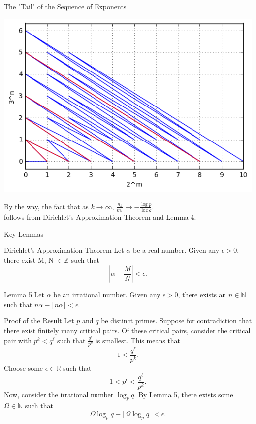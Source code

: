 \documentclass{beamer}
\newcommand{\Z}{{\mathbb Z}}
\newcommand{\N}{{\mathbb N}}
\newcommand{\R}{{\mathbb R}}
\newcommand\floor[1]{\lfloor#1\rfloor}
\begin{document}
\begin{frame}{The "Tail" of the Sequence of Exponents}%
\begin{center}

\includegraphics[scale=.48]{slope_plot4.png} 

By the way, the fact that as $k \to \infty$, $\frac{n_k}{m_k} \to -\frac{\log p}{\log q}$. \\ follows from Dirichlet's Approximation Theorem and Lemma 4. 
\end{center}

\end{frame}

\begin{frame}{Key Lemmas} 
    \begin{block}{Dirichlet's Approximation Theorem}
    Let $\alpha$ be a real number. Given any $\epsilon>0$, there exist M, N $\in \Z$ such that
    $$ \left| \alpha - \frac{M}{N}\right|<\epsilon.$$
    \end{block}
    
    \begin{block}{Lemma 5}
        Let $\alpha$ be an irrational number. Given any $\epsilon > 0$, there exists an $n \in \N$ such that $n\alpha-\floor{n\alpha}<\epsilon$.
    \end{block}
\end{frame}

\begin{frame}{Proof of the Result}
    Let $p$ and $q$ be distinct primes. Suppose for contradiction that there exist finitely many critical pairs. Of these critical pairs, consider the critical pair with $p^{k} < q^{\ell}$ such that $\frac{q^{\ell}}{p^{k}}$ is smallest. This means that 
$$1 < \frac{q^{\ell}}{p^{k}}.$$
Choose some $\epsilon\in\R$ such that 
$$1<p^\epsilon<\frac{q^{\ell}}{p^{k}}.$$
Now, consider the irrational number $\log_pq$. By Lemma 5, there exists some $\Omega\in\N$ such that 
$$\Omega\log_pq - \floor{\Omega\log_pq} < \epsilon.$$
\end{frame}
\end{document}
